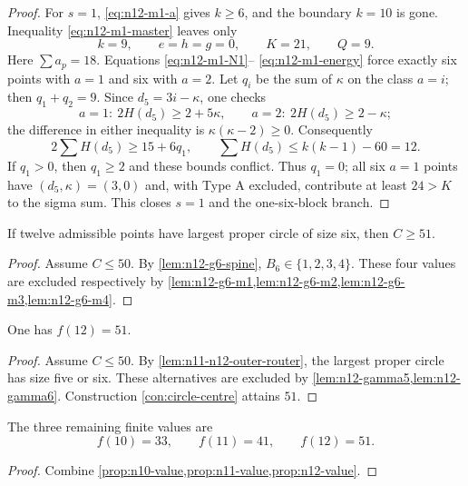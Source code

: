 \begin{proof}
For $s=1$, \eqref{eq:n12-m1-a} gives $k\ge6$, and the boundary $k=10$ is
gone.  Inequality \eqref{eq:n12-m1-master} leaves only
\[
k=9,\qquad e=h=g=0,\qquad K=21,\qquad Q=9.
\]
Here $\sum a_p=18$.  Equations \eqref{eq:n12-m1-N1}--
\eqref{eq:n12-m1-energy} force exactly six points with $a=1$ and six with
$a=2$.  Let $q_i$ be the sum of $\kappa$ on the class $a=i$; then
$q_1+q_2=9$.  Since $d_5=3i-\kappa$, one checks
\[
a=1:\ 2H(d_5)\ge2+5\kappa,\qquad
a=2:\ 2H(d_5)\ge2-\kappa;
\]
the difference in either inequality is $\kappa(\kappa-2)\ge0$.
Consequently
\[
2\sum H(d_5)\ge15+6q_1,\qquad
\sum H(d_5)\le k(k-1)-60=12.
\]
If $q_1>0$, then $q_1\ge2$ and these bounds conflict.  Thus $q_1=0$;
all six $a=1$ points have $(d_5,\kappa)=(3,0)$ and, with Type A excluded,
contribute at least $24>K$ to the sigma sum.  This closes $s=1$ and the
one-six-block branch.
\end{proof}

\begin{lemma}\label{lem:n12-gamma6}
If twelve admissible points have largest proper circle of size six, then
$C\ge51$.
\end{lemma}

\begin{proof}
Assume $C\le50$.  By \cref{lem:n12-g6-spine},
$B_6\in\{1,2,3,4\}$.  These four values are excluded respectively by
\cref{lem:n12-g6-m1,lem:n12-g6-m2,lem:n12-g6-m3,lem:n12-g6-m4}.
\end{proof}


\begin{proposition}\label{prop:n12-value}
One has $f(12)=51$.
\end{proposition}

\begin{proof}
Assume $C\le50$.  By \cref{lem:n11-n12-outer-router}, the largest proper
circle has size five or six.  These alternatives are excluded by
\cref{lem:n12-gamma5,lem:n12-gamma6}.  Construction
\ref{con:circle-centre} attains $51$.
\end{proof}

\begin{theorem}\label{thm:finite-n10-n12}
The three remaining finite values are
\[
 f(10)=33,\qquad f(11)=41,\qquad f(12)=51.
\]
\end{theorem}

\begin{proof}
Combine \cref{prop:n10-value,prop:n11-value,prop:n12-value}.
\end{proof}
